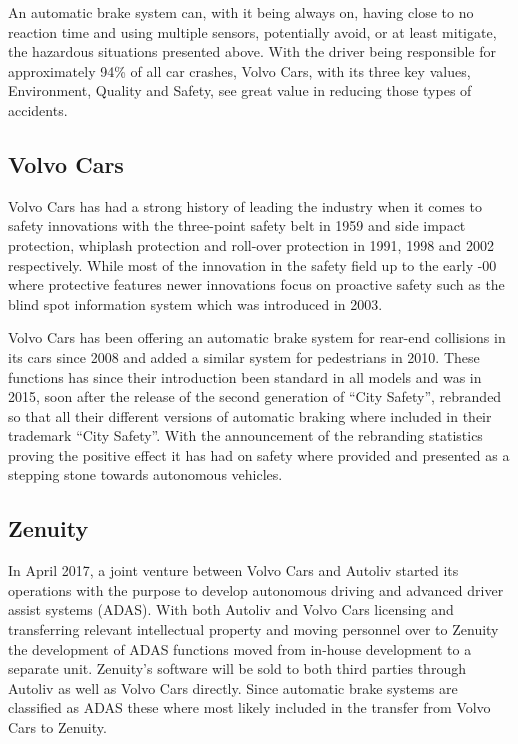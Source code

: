 \documentclass[conference]{IEEEtran}
\begin{document}
An automatic brake system can, with it being always on, having close to no reaction time and using multiple sensors, potentially avoid, or at least mitigate, the hazardous situations presented above. With the driver being responsible for approximately 94\% of all car crashes, Volvo Cars, with its three key values, Environment, Quality and Safety, see great value in reducing those types of accidents. \cite{CrashStats,VolvoValues}

\subsection{Volvo Cars}
Volvo Cars has had a strong history of leading the industry when it comes to safety innovations with the three-point safety belt in 1959 and side impact protection, whiplash protection and roll-over protection in 1991, 1998 and 2002 respectively. 
While most of the innovation in the safety field up to the early -00 where protective features newer innovations focus on proactive safety such as the blind spot information system which was introduced in 2003. \cite{VolvoInnovation}

Volvo Cars has been offering an automatic brake system for rear-end collisions in its cars since 2008 and added a similar system for pedestrians in 2010. \cite{VolvoInnovation}
These functions has since their introduction been standard in all models and was in 2015, soon after the release of the second generation of ``City Safety'', rebranded so that all their different versions of automatic braking where included in their trademark ``City Safety''. \cite{CitySafety} With the announcement of the rebranding statistics proving the positive effect it has had on safety where provided and presented as a stepping stone towards autonomous vehicles. \cite{CitySafety}

\subsection{Zenuity}
In April 2017, a joint venture between Volvo Cars and Autoliv started its operations with the purpose to develop autonomous driving and advanced driver assist systems (ADAS). With both Autoliv and Volvo Cars licensing and transferring relevant intellectual property and moving personnel over to Zenuity the development of ADAS functions moved from in-house development to a separate unit. Zenuity's software will be sold to both third parties through Autoliv as well as Volvo Cars directly. \cite{ZenuityLaunch} Since automatic brake systems are classified as ADAS these where most likely included in the transfer from Volvo Cars to Zenuity.
\end{document}
